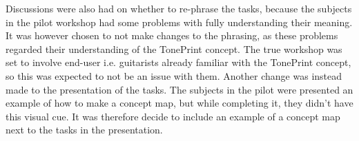 Discussions were also had on whether to re-phrase the tasks, because the subjects in the pilot workshop had some problems with fully understanding their meaning. It was however chosen to not make changes to the phrasing, as these problems regarded their understanding of the TonePrint concept. The true workshop was set to involve end-user i.e. guitarists already familiar with the TonePrint concept, so this was expected to not be an issue with them. Another change was instead made to the presentation of the tasks. The subjects in the pilot were presented an example of how to make a concept map, but while completing it, they didn't have this visual cue. It was therefore decide to include an example of a concept map next to the tasks in the presentation.

